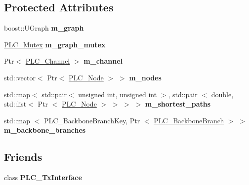 \subsection*{\-Protected \-Attributes}
\begin{DoxyCompactItemize}
\item 
\hypertarget{classns3_1_1PLC__Graph_ad13ed40f420330d56cf09ce1a4c12530}{boost\-::\-U\-Graph {\bfseries m\-\_\-graph}}\label{classns3_1_1PLC__Graph_ad13ed40f420330d56cf09ce1a4c12530}

\item 
\hypertarget{classns3_1_1PLC__Graph_a87a60248a007f1623e10c018092da7f5}{\hyperlink{structns3_1_1PLC__Mutex}{\-P\-L\-C\-\_\-\-Mutex} {\bfseries m\-\_\-graph\-\_\-mutex}}\label{classns3_1_1PLC__Graph_a87a60248a007f1623e10c018092da7f5}

\item 
\hypertarget{classns3_1_1PLC__Graph_a50f681762429c722e78aa6e827078ccc}{\-Ptr$<$ \hyperlink{classns3_1_1PLC__Channel}{\-P\-L\-C\-\_\-\-Channel} $>$ {\bfseries m\-\_\-channel}}\label{classns3_1_1PLC__Graph_a50f681762429c722e78aa6e827078ccc}

\item 
\hypertarget{classns3_1_1PLC__Graph_a904350cff841221d0bdb3adedfc2b8ae}{std\-::vector$<$ \-Ptr$<$ \hyperlink{classns3_1_1PLC__Node}{\-P\-L\-C\-\_\-\-Node} $>$ $>$ {\bfseries m\-\_\-nodes}}\label{classns3_1_1PLC__Graph_a904350cff841221d0bdb3adedfc2b8ae}

\item 
\hypertarget{classns3_1_1PLC__Graph_a90b738e71acf3ea34f9d4fbb8825b860}{std\-::map$<$ std\-::pair$<$ unsigned \*
int, unsigned int $>$, std\-::pair\*
$<$ double, std\-::list$<$ \-Ptr\*
$<$ \hyperlink{classns3_1_1PLC__Node}{\-P\-L\-C\-\_\-\-Node} $>$ $>$ $>$ $>$ {\bfseries m\-\_\-shortest\-\_\-paths}}\label{classns3_1_1PLC__Graph_a90b738e71acf3ea34f9d4fbb8825b860}

\item 
\hypertarget{classns3_1_1PLC__Graph_ab566852171d70687a5965c7099c01c44}{std\-::map\*
$<$ \-P\-L\-C\-\_\-\-Backbone\-Branch\-Key, \-Ptr\*
$<$ \hyperlink{classns3_1_1PLC__BackboneBranch}{\-P\-L\-C\-\_\-\-Backbone\-Branch} $>$ $>$ {\bfseries m\-\_\-backbone\-\_\-branches}}\label{classns3_1_1PLC__Graph_ab566852171d70687a5965c7099c01c44}

\end{DoxyCompactItemize}
\subsection*{\-Friends}
\begin{DoxyCompactItemize}
\item 
\hypertarget{classns3_1_1PLC__Graph_aa66746b40db26e1809096549f957b7ac}{class {\bfseries \-P\-L\-C\-\_\-\-Tx\-Interface}}\label{classns3_1_1PLC__Graph_aa66746b40db26e1809096549f957b7ac}

\end{DoxyCompactItemize}


